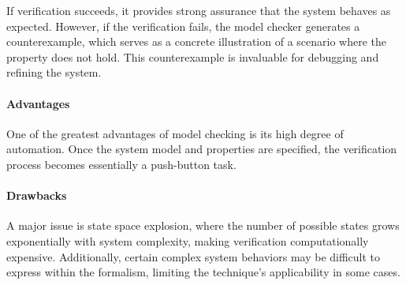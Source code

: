 If verification succeeds, it provides strong assurance that the system behaves as expected. 
However, if the verification fails, the model checker generates a counterexample, which serves as a concrete illustration of a scenario where the property does not hold. 
This counterexample is invaluable for debugging and refining the system.

\paragraph*{Advantages}
One of the greatest advantages of model checking is its high degree of automation. 
Once the system model and properties are specified, the verification process becomes essentially a push-button task.

\paragraph*{Drawbacks}
A major issue is state space explosion, where the number of possible states grows exponentially with system complexity, making verification computationally expensive. 
Additionally, certain complex system behaviors may be difficult to express within the formalism, limiting the technique's applicability in some cases.